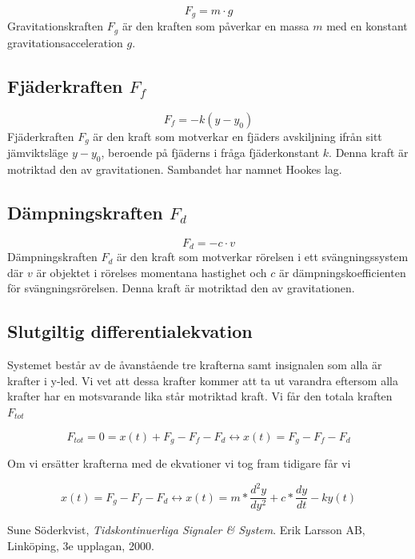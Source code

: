 \documentclass[10pt,a4paper]{article}
\begin{document}
\begin{equation}
F_g = m \cdot g
\end{equation}
Gravitationskraften $F_g$ är den kraften som påverkar en massa $m$ med en konstant gravitationsacceleration $g$. 

\subsection{Fjäderkraften $F_f$}

\begin{equation}
F_f = -k(y - y_0)
\end{equation}
Fjäderkraften $F_g$ är den kraft som motverkar en fjäders avskiljning ifrån sitt jämviktsläge $y-y_0$, beroende på fjäderns i fråga fjäderkonstant $k$. Denna kraft är motriktad den av gravitationen. Sambandet har namnet Hookes lag.

\subsection{Dämpningskraften $F_d$}
\begin{equation}
F_d = -c \cdot v
\end{equation}
Dämpningskraften $F_d$ är den kraft som motverkar rörelsen i ett svängningssystem där $v$ är objektet i rörelses momentana hastighet och $c$ är dämpningskoefficienten för svängningsrörelsen. Denna kraft är motriktad den av gravitationen.

\subsection{Slutgiltig differentialekvation}

Systemet består av de åvanstående tre krafterna samt insignalen som alla är krafter i y-led. Vi vet att dessa krafter kommer att ta ut varandra eftersom alla krafter har en motsvarande lika står motriktad kraft. Vi får den totala kraften $F_{tot}$

\begin{equation}
F_{tot} = 0 = x(t) + F_g - F_f - F_d \leftrightarrow x(t) = F_g - F_f - F_d 
\end{equation}

Om vi ersätter krafterna med de ekvationer vi tog fram tidigare får vi

\begin{equation}
x(t) = F_g - F_f - F_d \leftrightarrow x(t) = m*\frac{d^2y}{dy^2} + c*\frac{dy}{dt} -ky(t)
\end{equation}

\newpage

\begin{thebibliography}{9}

  Sune Söderkvist,
  \emph{Tidskontinuerliga Signaler \& System}.
  \linebreak
  Erik Larsson AB, Linköping,
  3e upplagan,
  2000.

\end{thebibliography}
\end{document}
